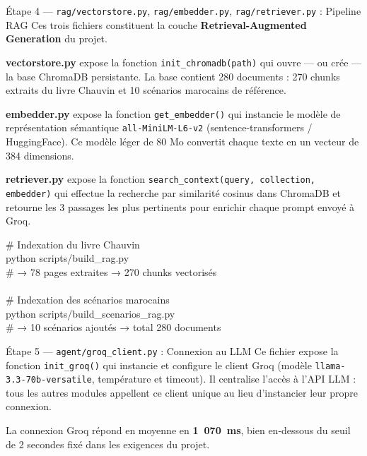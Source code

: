 \documentclass[12pt, a4paper]{report}
\begin{document}
\bigskip

\begin{stepbox}{Étape 4 — \texttt{rag/vectorstore.py}, \texttt{rag/embedder.py}, \texttt{rag/retriever.py} : Pipeline RAG}
Ces trois fichiers constituent la couche \textbf{Retrieval-Augmented Generation} du projet.

\medskip
\textbf{vectorstore.py} expose la fonction \texttt{init\_chromadb(path)} qui ouvre — ou crée — la base ChromaDB persistante. La base contient 280 documents : 270 chunks extraits du livre Chauvin et 10 scénarios marocains de référence.

\medskip
\textbf{embedder.py} expose la fonction \texttt{get\_embedder()} qui instancie le modèle de représentation sémantique \texttt{all-MiniLM-L6-v2} (sentence-transformers / HuggingFace). Ce modèle léger de 80 Mo convertit chaque texte en un vecteur de 384 dimensions.

\medskip
\textbf{retriever.py} expose la fonction \texttt{search\_context(query, collection, embedder)} qui effectue la recherche par similarité cosinus dans ChromaDB et retourne les 3 passages les plus pertinents pour enrichir chaque prompt envoyé à Groq.

\begin{codebox}
\# Indexation du livre Chauvin\\
python scripts/build\_rag.py\\
\# → 78 pages extraites → 270 chunks vectorisés\\
\\
\# Indexation des scénarios marocains\\
python scripts/build\_scenarios\_rag.py\\
\# → 10 scénarios ajoutés → total 280 documents
\end{codebox}
\end{stepbox}

\bigskip

\begin{stepbox}{Étape 5 — \texttt{agent/groq\_client.py} : Connexion au LLM}
Ce fichier expose la fonction \texttt{init\_groq()} qui instancie et configure le client Groq (modèle \texttt{llama-3.3-70b-versatile}, température et timeout). Il centralise l'accès à l'API LLM : tous les autres modules appellent ce client unique au lieu d'instancier leur propre connexion.

La connexion Groq répond en moyenne en \textbf{1~070~ms}, bien en-dessous du seuil de 2 secondes fixé dans les exigences du projet.
\end{stepbox}
\end{document}
